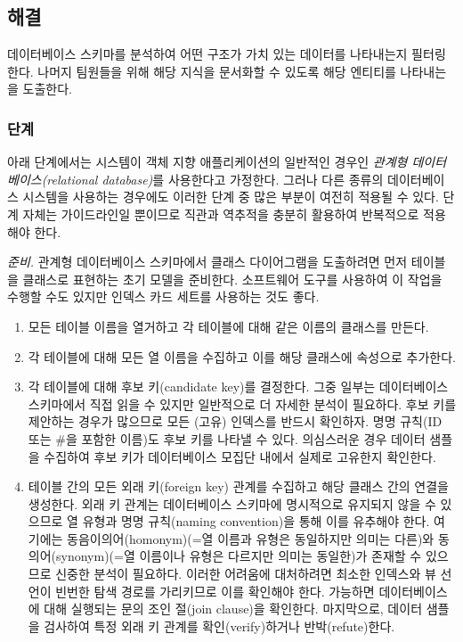 \documentclass[a4paper,10pt,twoside]{book}
\begin{document}
\subsection*{해결}

데이터베이스 스키마를 분석하여 어떤 구조가 가치 있는 데이터를 나타내는지 필터링한다. 나머지 팀원들을 위해 해당 지식을 문서화할 수 있도록 해당 엔티티를 나타내는 을 도출한다.

\subsubsection*{단계}

아래 단계에서는 시스템이 객체 지향 애플리케이션의 일반적인 경우인 \emph{관계형 데이터베이스(relational database)}를 사용한다고 가정한다. 그러나 다른 종류의 데이터베이스 시스템을 사용하는 경우에도 이러한 단계 중 많은 부분이 여전히 적용될 수 있다. 단계 자체는 가이드라인일 뿐이므로 직관과 역추적을 충분히 활용하여 반복적으로 적용해야 한다.

\noindent
\emph{준비.}
관계형 데이터베이스 스키마에서 클래스 다이어그램을 도출하려면 먼저 테이블을 클래스로 표현하는 초기 모델을 준비한다. 소프트웨어 도구를 사용하여 이 작업을 수행할 수도 있지만 인덱스 카드 세트를 사용하는 것도 좋다.

\begin{enumerate}
  \item 모든 테이블 이름을 열거하고 각 테이블에 대해 같은 이름의 클래스를 만든다.

  \item 각 테이블에 대해 모든 열 이름을 수집하고 이를 해당 클래스에 속성으로 추가한다.

  \item 각 테이블에 대해 후보 키(candidate key)를 결정한다. 그중 일부는 데이터베이스 스키마에서 직접 읽을 수 있지만 일반적으로 더 자세한 분석이 필요하다. 후보 키를 제안하는 경우가 많으므로 모든 (고유) 인덱스를 반드시 확인하자. 명명 규칙(ID 또는 \#을 포함한 이름)도 후보 키를 나타낼 수 있다. 의심스러운 경우 데이터 샘플을 수집하여 후보 키가 데이터베이스 모집단 내에서 실제로 고유한지 확인한다.

  \item 테이블 간의 모든 외래 키(foreign key) 관계를 수집하고 해당 클래스 간의 연결을 생성한다. 외래 키 관계는 데이터베이스 스키마에 명시적으로 유지되지 않을 수 있으므로 열 유형과 명명 규칙(naming convention)을 통해 이를 유추해야 한다. 여기에는 동음이의어(homonym)(=열 이름과 유형은 동일하지만 의미는 다른)와 동의어(synonym)(=열 이름이나 유형은 다르지만 의미는 동일한)가 존재할 수 있으므로 신중한 분석이 필요하다. 이러한 어려움에 대처하려면 최소한 인덱스와 뷰 선언이 빈번한 탐색 경로를 가리키므로 이를 확인해야 한다. 가능하면 데이터베이스에 대해 실행되는  문의 조인 절(join clause)을 확인한다. 마지막으로, 데이터 샘플을 검사하여 특정 외래 키 관계를 확인(verify)하거나 반박(refute)한다.

\end{enumerate}
\end{document}
